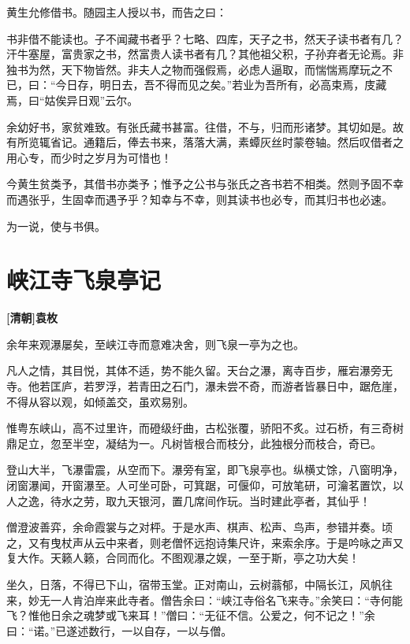 \documentclass[UTF8,titlepage,oneside]{ctexbook}
\begin{document}
黄生允修借书。随园主人授以书，而告之曰：


书非借不能读也。子不闻藏书者乎？七略、四库，天子之书，然天子读书者有几？汗牛塞屋，富贵家之书，然富贵人读书者有几？其他祖父积，子孙弃者无论焉。非独书为然，天下物皆然。非夫人之物而强假焉，必虑人逼取，而惴惴焉摩玩之不已，曰：“今日存，明日去，吾不得而见之矣。”若业为吾所有，必高束焉，庋藏焉，曰“姑俟异日观”云尔。


余幼好书，家贫难致。有张氏藏书甚富。往借，不与，归而形诸梦。其切如是。故有所览辄省记。通籍后，俸去书来，落落大满，素蟫灰丝时蒙卷轴。然后叹借者之用心专，而少时之岁月为可惜也！


今黄生贫类予，其借书亦类予；惟予之公书与张氏之吝书若不相类。然则予固不幸而遇张乎，生固幸而遇予乎？知幸与不幸，则其读书也必专，而其归书也必速。


为一说，使与书俱。



\chapter*{峡江寺飞泉亭记}
\begin{center}
	\textbf{[清朝]袁枚}
\end{center}


余年来观瀑屡矣，至峡江寺而意难决舍，则飞泉一亭为之也。


凡人之情，其目悦，其体不适，势不能久留。天台之瀑，离寺百步，雁宕瀑旁无寺。他若匡庐，若罗浮，若青田之石门，瀑未尝不奇，而游者皆暴日中，踞危崖，不得从容以观，如倾盖交，虽欢易别。


惟粤东峡山，高不过里许，而磴级纡曲，古松张覆，骄阳不炙。过石桥，有三奇树鼎足立，忽至半空，凝结为一。凡树皆根合而枝分，此独根分而枝合，奇已。


登山大半，飞瀑雷震，从空而下。瀑旁有室，即飞泉亭也。纵横丈馀，八窗明净，闭窗瀑闻，开窗瀑至。人可坐可卧，可箕踞，可偃仰，可放笔研，可瀹茗置饮，以人之逸，待水之劳，取九天银河，置几席间作玩。当时建此亭者，其仙乎！


僧澄波善弈，余命霞裳与之对枰。于是水声、棋声、松声、鸟声，参错并奏。顷之，又有曳杖声从云中来者，则老僧怀远抱诗集尺许，来索余序。于是吟咏之声又复大作。天籁人籁，合同而化。不图观瀑之娱，一至于斯，亭之功大矣！


坐久，日落，不得已下山，宿带玉堂。正对南山，云树蓊郁，中隔长江，风帆往来，妙无一人肯泊岸来此寺者。僧告余曰：“峡江寺俗名飞来寺。”余笑曰：“寺何能飞？惟他日余之魂梦或飞来耳！”僧曰：“无征不信。公爱之，何不记之！”余曰：“诺。”已遂述数行，一以自存，一以与僧。
\end{document}
